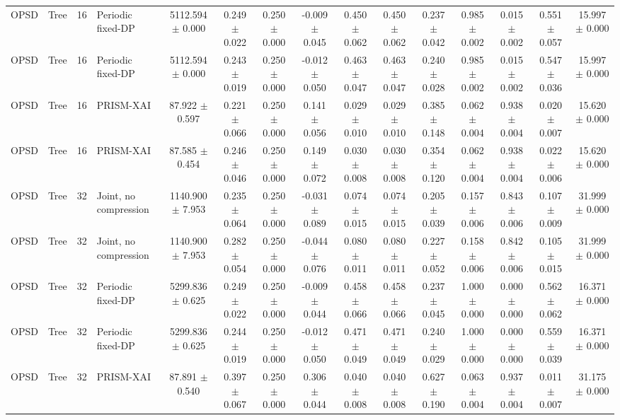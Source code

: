 \begin{tabular}{llllccccccccccc}
OPSD & Tree & 16 & Periodic fixed-DP & 5112.594 $\pm$ 0.000 & 0.249 $\pm$ 0.022 & 0.250 $\pm$ 0.000 & -0.009 $\pm$ 0.045 & 0.450 $\pm$ 0.062 & 0.450 $\pm$ 0.062 & 0.237 $\pm$ 0.042 & 0.985 $\pm$ 0.002 & 0.015 $\pm$ 0.002 & 0.551 $\pm$ 0.057 & 15.997 $\pm$ 0.000 \\
OPSD & Tree & 16 & Periodic fixed-DP & 5112.594 $\pm$ 0.000 & 0.243 $\pm$ 0.019 & 0.250 $\pm$ 0.000 & -0.012 $\pm$ 0.050 & 0.463 $\pm$ 0.047 & 0.463 $\pm$ 0.047 & 0.240 $\pm$ 0.028 & 0.985 $\pm$ 0.002 & 0.015 $\pm$ 0.002 & 0.547 $\pm$ 0.036 & 15.997 $\pm$ 0.000 \\
OPSD & Tree & 16 & PRISM-XAI & 87.922 $\pm$ 0.597 & 0.221 $\pm$ 0.066 & 0.250 $\pm$ 0.000 & 0.141 $\pm$ 0.056 & 0.029 $\pm$ 0.010 & 0.029 $\pm$ 0.010 & 0.385 $\pm$ 0.148 & 0.062 $\pm$ 0.004 & 0.938 $\pm$ 0.004 & 0.020 $\pm$ 0.007 & 15.620 $\pm$ 0.000 \\
OPSD & Tree & 16 & PRISM-XAI & 87.585 $\pm$ 0.454 & 0.246 $\pm$ 0.046 & 0.250 $\pm$ 0.000 & 0.149 $\pm$ 0.072 & 0.030 $\pm$ 0.008 & 0.030 $\pm$ 0.008 & 0.354 $\pm$ 0.120 & 0.062 $\pm$ 0.004 & 0.938 $\pm$ 0.004 & 0.022 $\pm$ 0.006 & 15.620 $\pm$ 0.000 \\
OPSD & Tree & 32 & Joint, no compression & 1140.900 $\pm$ 7.953 & 0.235 $\pm$ 0.064 & 0.250 $\pm$ 0.000 & -0.031 $\pm$ 0.089 & 0.074 $\pm$ 0.015 & 0.074 $\pm$ 0.015 & 0.205 $\pm$ 0.039 & 0.157 $\pm$ 0.006 & 0.843 $\pm$ 0.006 & 0.107 $\pm$ 0.009 & 31.999 $\pm$ 0.000 \\
OPSD & Tree & 32 & Joint, no compression & 1140.900 $\pm$ 7.953 & 0.282 $\pm$ 0.054 & 0.250 $\pm$ 0.000 & -0.044 $\pm$ 0.076 & 0.080 $\pm$ 0.011 & 0.080 $\pm$ 0.011 & 0.227 $\pm$ 0.052 & 0.158 $\pm$ 0.006 & 0.842 $\pm$ 0.006 & 0.105 $\pm$ 0.015 & 31.999 $\pm$ 0.000 \\
OPSD & Tree & 32 & Periodic fixed-DP & 5299.836 $\pm$ 0.625 & 0.249 $\pm$ 0.022 & 0.250 $\pm$ 0.000 & -0.009 $\pm$ 0.044 & 0.458 $\pm$ 0.066 & 0.458 $\pm$ 0.066 & 0.237 $\pm$ 0.045 & 1.000 $\pm$ 0.000 & 0.000 $\pm$ 0.000 & 0.562 $\pm$ 0.062 & 16.371 $\pm$ 0.000 \\
OPSD & Tree & 32 & Periodic fixed-DP & 5299.836 $\pm$ 0.625 & 0.244 $\pm$ 0.019 & 0.250 $\pm$ 0.000 & -0.012 $\pm$ 0.050 & 0.471 $\pm$ 0.049 & 0.471 $\pm$ 0.049 & 0.240 $\pm$ 0.029 & 1.000 $\pm$ 0.000 & 0.000 $\pm$ 0.000 & 0.559 $\pm$ 0.039 & 16.371 $\pm$ 0.000 \\
OPSD & Tree & 32 & PRISM-XAI & 87.891 $\pm$ 0.540 & 0.397 $\pm$ 0.067 & 0.250 $\pm$ 0.000 & 0.306 $\pm$ 0.044 & 0.040 $\pm$ 0.008 & 0.040 $\pm$ 0.008 & 0.627 $\pm$ 0.190 & 0.063 $\pm$ 0.004 & 0.937 $\pm$ 0.004 & 0.011 $\pm$ 0.007 & 31.175 $\pm$ 0.000 \\

\end{tabular}
